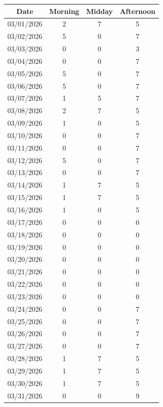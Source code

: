 \documentclass{notes}
\begin{document}
\begin{center}
\begin{tabular}{c|ccc}
		Date & Morning & Midday & Afternoon\\
		\hline
		03/01/2026 & 2 & 7 & 5\\
		03/02/2026 & 5 & 0 & 7\\
		03/03/2026 & 0 & 0 & 3\\
		03/04/2026 & 0 & 0 & 7\\
		03/05/2026 & 5 & 0 & 7\\
		03/06/2026 & 5 & 0 & 7\\
		03/07/2026 & 1 & 5 & 7\\
		03/08/2026 & 2 & 7 & 5\\
		03/09/2026 & 1 & 0 & 5\\
		03/10/2026 & 0 & 0 & 7\\
		03/11/2026 & 0 & 0 & 7\\
		03/12/2026 & 5 & 0 & 7\\
		03/13/2026 & 0 & 0 & 7\\
		03/14/2026 & 1 & 7 & 5\\
		03/15/2026 & 1 & 7 & 5\\
		03/16/2026 & 1 & 0 & 5\\
		03/17/2026 & 0 & 0 & 0\\
		03/18/2026 & 0 & 0 & 0\\
		03/19/2026 & 0 & 0 & 0\\
		03/20/2026 & 0 & 0 & 0\\
		03/21/2026 & 0 & 0 & 0\\
		03/22/2026 & 0 & 0 & 0\\
		03/23/2026 & 0 & 0 & 0\\
		03/24/2026 & 0 & 0 & 7\\
		03/25/2026 & 0 & 0 & 7\\
		03/26/2026 & 0 & 0 & 7\\
		03/27/2026 & 0 & 0 & 7\\
		03/28/2026 & 1 & 7 & 5\\
		03/29/2026 & 1 & 7 & 5\\
		03/30/2026 & 1 & 7 & 5\\
		03/31/2026 & 0 & 0 & 9
	\end{tabular}
\end{center}

\pagebreak
\end{document}
